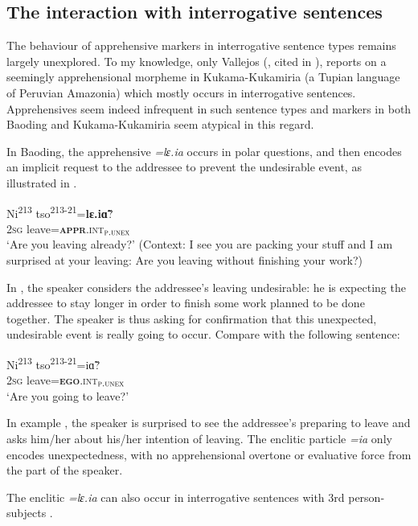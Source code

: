 \documentclass[output=paper,colorlinks,citecolor=brown, language=chinese]{langscibook}
\begin{document}
\subsection{The interaction with interrogative sentences}
\label{subsec:interrogative}

The behaviour of apprehensive markers in interrogative sentence types remains largely unexplored. To my knowledge, only Vallejos (\citeyear[Chapter 12]{Vallejos2016}, cited in \citealt{vuillermet2018a}), reports on a seemingly apprehensional morpheme in Kukama-Kukamiria (a Tupian language of Peruvian Amazonia) which mostly occurs in interrogative sentences. Apprehensives seem indeed infrequent in such sentence types and markers in both Baoding and Kukama-Kukamiria seem atypical in this regard. 

In Baoding, the apprehensive \textit{=lɛ.ia} occurs in polar questions, and then encodes an implicit request to the addressee to prevent the undesirable event, as illustrated in .

\ea\label{ex:Song41}
\gll Ni\textsuperscript{213} tso\textsuperscript{213-21}=\textbf{lɛ.i\~ɑ}? \\
\textsc{2sg} leave=\textsc{\textbf{appr}.int$_{\textsc{p.unex}}$} \\
\glt `Are you leaving already?' (Context: I see you are packing your stuff and I am surprised at your leaving: Are you leaving without finishing your work?)
\z

\noindent In , the  speaker considers the addressee's leaving undesirable: he is expecting the addressee to stay longer in order to finish some work planned to be done together. The speaker is thus asking for confirmation that this unexpected, undesirable event is really going to occur. Compare with the following sentence:


\ea\label{ex:Song42}
\gll Ni\textsuperscript{213} tso\textsuperscript{213-21}=i\~ɑ? \\
\textsc{2sg} leave=\textsc{\textbf{ego}.int$_{\textsc{p.unex}}$} \\
\glt `Are you going to leave?'
\z

\noindent In example , the speaker is surprised to see the addressee's preparing to leave and asks him/her about his/her intention of leaving. The enclitic particle \textit{=ia} only encodes unexpectedness, with no apprehensional overtone or evaluative force from the part of the speaker. 

The enclitic \textit{=lɛ.ia} can also occur in interrogative sentences with 3rd person-subjects .
\end{document}
